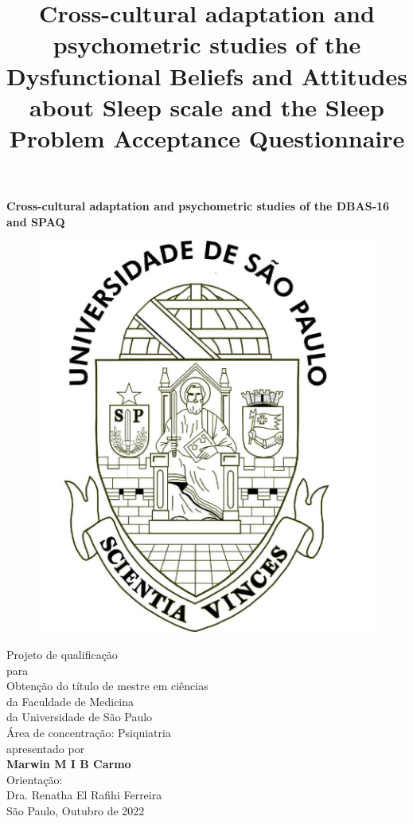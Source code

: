 \documentclass[
  ,doc,11pt, twoside,floatsintext]{apa6}
\title{Cross-cultural adaptation and psychometric studies of the Dysfunctional Beliefs and Attitudes about Sleep scale and the Sleep Problem Acceptance Questionnaire}
\author{\textsuperscript{}}
\date{}
\affiliation{\vspace{0.5cm}\textsuperscript{} }
\begin{document}
\maketitle

\clearpage

\mbox{}\thispagestyle{empty}\clearpage

\setcounter{page}{1}

\thispagestyle{empty}
\begin{center}
\vspace*{10mm}
\textbf{\Large Cross-cultural adaptation and psychometric studies of the DBAS-16 and SPAQ}\\

\begin{figure}[h]
\begin{center}
\includegraphics[width=!,totalheight=!,scale=0.18]{usp-brazao.jpg}
\end{center}
\end{figure}
{ 
Projeto de qualificação\\
para\\ 
Obtenção do título de mestre em ciências\\
da Faculdade de Medicina\\
da Universidade de São Paulo  \\
Área de concentração: Psiquiatria  \\
apresentado por  \\ 
\smallskip
\textbf{Marwin M I B Carmo}\\
\smallskip
Orientação:  \\
Dra. Renatha El Rafihi Ferreira  \\
\smallskip
São Paulo, Outubro de 2022\\
}
\end{center}
\end{document}
